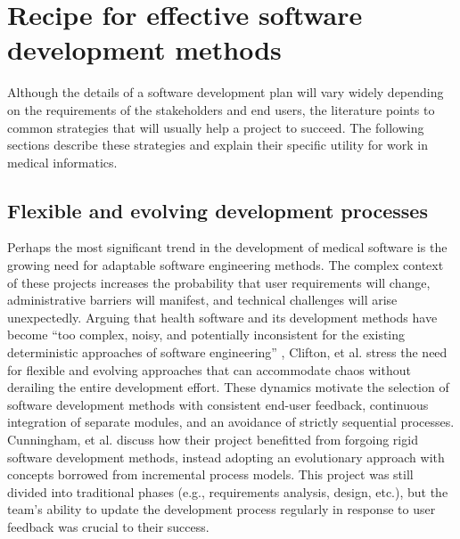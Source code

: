 \documentclass[12pt]{article} %
\begin{document}

\section{Recipe for effective software development methods}
Although the details of a software development plan will vary widely depending on the requirements of the stakeholders and end users, the literature points to common strategies that will usually help a project to succeed. The following sections describe these strategies and explain their specific utility for work in medical informatics.

\subsection{Flexible and evolving development processes}
Perhaps the most significant trend in the development of medical software is the growing need for adaptable software engineering methods. 
The complex context of these projects increases the probability that user requirements will change, administrative barriers will manifest, and technical challenges will arise unexpectedly.
Arguing that health software and its development methods have become ``too complex, noisy, and potentially inconsistent for the existing deterministic approaches of software engineering'' \cite{clifton2012}, Clifton, et al. stress the need for flexible and evolving approaches that can accommodate chaos without derailing the entire development effort.
These dynamics motivate the selection of software development methods with consistent end-user feedback, continuous integration of separate modules, and an avoidance of strictly sequential processes.
Cunningham, et al. \cite{cunningham2012} discuss how their project benefitted from forgoing rigid software development methods, instead adopting an evolutionary approach with concepts borrowed from incremental process models.
This project was still divided into traditional phases (e.g., requirements analysis, design, etc.), but the team's ability to update the development process regularly in response to user feedback was crucial to their success.
\end{document}
